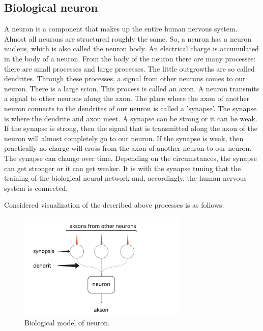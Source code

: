 \subsection{Biological neuron}
A neuron is a component that makes up the entire human nervous system. Almost all neurons are structured roughly the same. So, a neuron has a neuron nucleus, which is also called the neuron body. An electrical charge is accumulated in the body of a neuron. From the body of the neuron there are many processes: there are small processes and large processes. The little outgrowths are so called dendrites. Through these processes, a signal from other neurons comes to our neuron. There is a large scion. This process is called an axon. A neuron transmits a signal to other neurons along the axon. The place where the axon of another neuron connects to the dendrites of our neuron is called a 'synapse'. The synapse is where the dendrite and axon meet. A synapse can be strong or it can be weak. If the synapse is strong, then the signal that is transmitted along the axon of the neuron will almost completely go to our neuron. If the synapse is weak, then practically no charge will cross from the axon of another neuron to our neuron. The synapse can change over time. Depending on the circumstances, the synapse can get stronger or it can get weaker. It is with the synapse tuning that the training of the biological neural network and, accordingly, the human nervous system is connected.

Considered visualization of the described above processes is as follows:
\begin{figure}[h]
    \centering \includegraphics[width=8cm]{images/biological_neuron.jpg}
    \caption {Biological model of neuron.}
\end{figure}    

